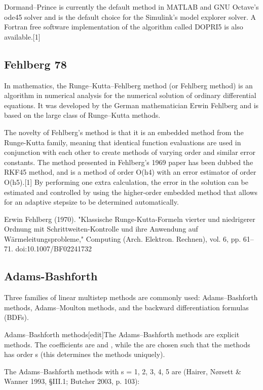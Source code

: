 Dormand–Prince is currently the default method in MATLAB and GNU Octave's ode45 solver and is the default choice for the Simulink's model explorer solver. A Fortran free software implementation of the algorithm called DOPRI5 is also available.[1]




\subsection{Fehlberg 78}
In mathematics, the Runge–Kutta–Fehlberg method (or Fehlberg method) is an algorithm in numerical analysis for the numerical solution of ordinary differential equations. It was developed by the German mathematician Erwin Fehlberg and is based on the large class of Runge–Kutta methods.

The novelty of Fehlberg's method is that it is an embedded method from the Runge-Kutta family, meaning that identical function evaluations are used in conjunction with each other to create methods of varying order and similar error constants. The method presented in Fehlberg's 1969 paper has been dubbed the RKF45 method, and is a method of order O(h4) with an error estimator of order O(h5).[1] By performing one extra calculation, the error in the solution can be estimated and controlled by using the higher-order embedded method that allows for an adaptive stepsize to be determined automatically.

Erwin Fehlberg (1970). "Klassische Runge-Kutta-Formeln vierter und niedrigerer Ordnung mit Schrittweiten-Kontrolle und ihre Anwendung auf Wärmeleitungsprobleme," Computing (Arch. Elektron. Rechnen), vol. 6, pp. 61–71. doi:10.1007/BF02241732




\subsection{Adams-Bashforth}
\label{Adams-Bashforth}

Three families of linear multistep methods are commonly used: Adams–Bashforth methods, Adams–Moulton methods, and the backward differentiation formulas (BDFs).

Adams–Bashforth methods[edit]The Adams–Bashforth methods are explicit methods. The coefficients are  and , while the  are chosen such that the methods has order s (this determines the methods uniquely).

The Adams–Bashforth methods with s = 1, 2, 3, 4, 5 are (Hairer, Nørsett \& Wanner 1993, §III.1; Butcher 2003, p. 103):




